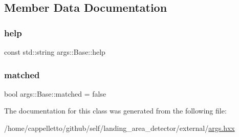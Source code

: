 \subsection{Member Data Documentation}
\mbox{\label{classargs_1_1_base_a9cdbbcdfa8e764c25f94dfe2c99c3b24}} 
\subsubsection{\texorpdfstring{help}{help}}
{\footnotesize\ttfamily const std\+::string args\+::\+Base\+::help\hspace{0.3cm}{\ttfamily [protected]}}

\mbox{\label{classargs_1_1_base_a8af1b95de08c309b60c3784a70b65bf1}} 
\subsubsection{\texorpdfstring{matched}{matched}}
{\footnotesize\ttfamily bool args\+::\+Base\+::matched = false\hspace{0.3cm}{\ttfamily [protected]}}



The documentation for this class was generated from the following file\+:\begin{DoxyCompactItemize}
\item 
/home/cappelletto/github/self/landing\+\_\+area\+\_\+detector/external/\hyperlink{args_8hxx}{args.\+hxx}\end{DoxyCompactItemize}
